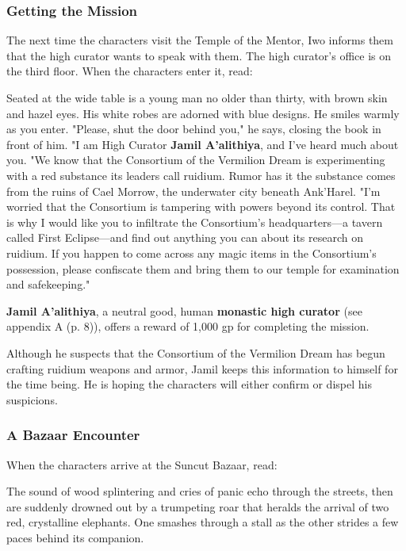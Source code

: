 \documentclass[letterpaper, 11pt, bg=full, twocolumn]{dndbook}
\begin{document}
\subsubsection{Getting the Mission}

The next time the characters visit the Temple of the Mentor, Iwo informs them that the high curator wants to speak with them. The high curator's office is on the third floor. When the characters enter it, read:

\begin{DndReadAloud}
Seated at the wide table is a young man no older than thirty, with brown skin and hazel eyes. His white robes are adorned with blue designs.
He smiles warmly as you enter. "Please, shut the door behind you," he says, closing the book in front of him. "I am High Curator \textbf{Jamil A'alithiya}, and I've heard much about you.
"We know that the Consortium of the Vermilion Dream is experimenting with a red substance its leaders call ruidium. Rumor has it the substance comes from the ruins of Cael Morrow, the underwater city beneath Ank'Harel.
"I'm worried that the Consortium is tampering with powers beyond its control. That is why I would like you to infiltrate the Consortium's headquarters---a tavern called First Eclipse---and find out anything you can about its research on ruidium. If you happen to come across any magic items in the Consortium's possession, please confiscate them and bring them to our temple for examination and safekeeping."
\end{DndReadAloud}

\textbf{Jamil A'alithiya}, a neutral good, human \textbf{monastic high curator} (see appendix A (p. 8)), offers a reward of 1,000 gp for completing the mission.

Although he suspects that the Consortium of the Vermilion Dream has begun crafting ruidium weapons and armor, Jamil keeps this information to himself for the time being. He is hoping the characters will either confirm or dispel his suspicions.

\subsubsection{A Bazaar Encounter}

When the characters arrive at the Suncut Bazaar, read:

\begin{DndReadAloud}
The sound of wood splintering and cries of panic echo through the streets, then are suddenly drowned out by a trumpeting roar that heralds the arrival of two red, crystalline elephants. One smashes through a stall as the other strides a few paces behind its companion.
\end{DndReadAloud}
\end{document}
